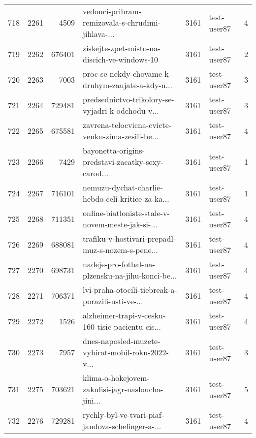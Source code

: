 \begin{tabular}{lrrlrlr}
718  &       2261 &     4509 &  vedouci-pribram-remizovala-s-chrudimi-jihlava-... &     3161 &                  test-user87 &               4 \\
719  &       2262 &   676401 &       ziskejte-zpet-misto-na-discich-ve-windows-10 &     3161 &                  test-user87 &               2 \\
720  &       2263 &     7003 &  proc-se-nekdy-chovame-k-druhym-zaujate-a-kdy-n... &     3161 &                  test-user87 &               3 \\
721  &       2264 &   729481 &  predsednictvo-trikolory-se-vyjadri-k-odchodu-v... &     3161 &                  test-user87 &               3 \\
722  &       2265 &   675581 &  zavrena-telocvicna-cvicte-venku-zima-zesili-be... &     3161 &                  test-user87 &               4 \\
723  &       2266 &     7429 &  bayonetta-origins-predstavi-zacatky-sexy-carod... &     3161 &                  test-user87 &               1 \\
724  &       2267 &   716101 &  nemuzu-dychat-charlie-hebdo-celi-kritice-za-ka... &     3161 &                  test-user87 &               1 \\
725  &       2268 &   711351 &  online-biatloniste-stale-v-novem-meste-jak-si-... &     3161 &                  test-user87 &               4 \\
726  &       2269 &   688081 &  trafiku-v-hostivari-prepadl-muz-s-nozem-s-pene... &     3161 &                  test-user87 &               4 \\
727  &       2270 &   698731 &  nadeje-pro-fotbal-na-plzensku-na-jihu-konci-be... &     3161 &                  test-user87 &               4 \\
728  &       2271 &   706371 &  lvi-praha-otocili-tiebreak-a-porazili-usti-ve-... &     3161 &                  test-user87 &               4 \\
729  &       2272 &     1526 &  alzheimer-trapi-v-cesku-160-tisic-pacientu-cis... &     3161 &                  test-user87 &               4 \\
730  &       2273 &     7957 &  dnes-naposled-muzete-vybirat-mobil-roku-2022-v... &     3161 &                  test-user87 &               3 \\
731  &       2275 &   703621 &  klima-o-hokejovem-zakulisi-jagr-nasloucha-jini... &     3161 &                  test-user87 &               5 \\
732  &       2276 &   729281 &  rychly-byl-ve-tvari-piaf-jandova-schelinger-a-... &     3161 &                  test-user87 &               4 \\

\end{tabular}
